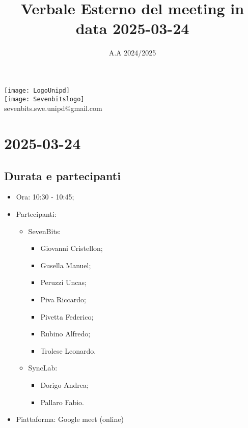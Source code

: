 \documentclass[10pt]{article}
\title{Verbale Esterno del meeting in data 2025-03-24} %
\date{A.A 2024/2025}
\begin{document}
\maketitle
\center 
\texttt{[image: LogoUnipd]}\\
\texttt{[image: Sevenbitslogo]}\\
sevenbits.swe.unipd@gmail.com\\
\vspace{2mm}

\newpage
\raggedright
\tableofcontents

\newpage
\section{2025-03-24} %
\subsection{Durata e partecipanti}
\begin{itemize}
\item Ora: 10:30 - 10:45; %
\item Partecipanti: 	
	\begin{itemize}
            \item SevenBits:
            \begin{itemize}
                \item Giovanni Cristellon;
                \item Gusella Manuel;
                \item Peruzzi Uncas;
                \item Piva Riccardo;
                \item Pivetta Federico;
                \item Rubino Alfredo;
                \item Trolese Leonardo.
	    \end{itemize}
            \item SyncLab:
            \begin{itemize}
                \item Dorigo Andrea;
                \item Pallaro Fabio.
	    \end{itemize}
	\end{itemize}
\item Piattaforma: Google meet (online)
\end{itemize}
\end{document}
